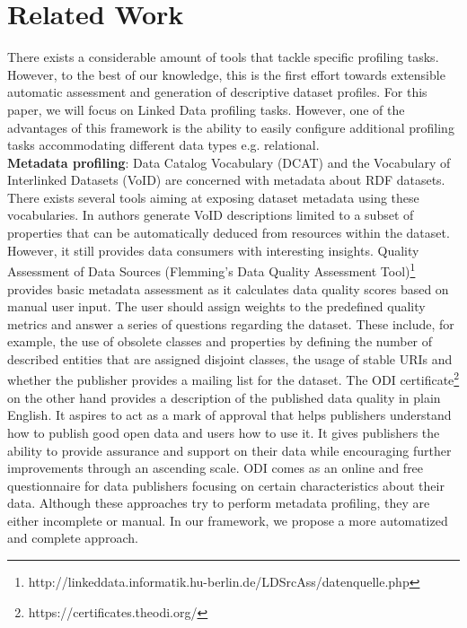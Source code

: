 \documentclass[runningheads,a4paper]{llncs}
\begin{document}

\section{Related Work}
\label{sec:Related Work}

There exists a considerable amount of tools that tackle specific profiling tasks. However, to the best of our knowledge, this is the first effort towards extensible automatic assessment and generation of descriptive dataset profiles. For this paper, we will focus on Linked Data profiling tasks. However, one of the advantages of this framework is the ability to easily configure additional profiling tasks accommodating different data types e.g. relational.\\

\textbf{Metadata profiling}: Data Catalog Vocabulary (DCAT) \cite{Erickson:14:DCV} and the Vocabulary of Interlinked Datasets (VoID) \cite{Cyganiak:11:DLD} are concerned with metadata about RDF datasets. There exists several tools aiming at exposing dataset metadata using these vocabularies. In \cite{BoHm:2011:CVD:2030805.2031001} authors generate VoID descriptions limited to a subset of properties that can be automatically deduced from resources within the dataset. However, it still provides data consumers with interesting insights. Quality Assessment of Data Sources (Flemming's Data Quality Assessment Tool)\footnote{http://linkeddata.informatik.hu-berlin.de/LDSrcAss/datenquelle.php} provides basic metadata assessment as it calculates data quality scores based on manual user input. The user should assign weights to the predefined quality metrics and answer a series of questions regarding the dataset. These include, for example, the use of obsolete classes and properties by defining the number of described entities that are assigned disjoint classes, the usage of stable URIs and whether the publisher provides a mailing list for the dataset. The ODI certificate\footnote {https://certificates.theodi.org/} on the other hand provides a description of the published data quality in plain English. It aspires to act as a mark of approval that helps publishers understand how to publish good open data and users how to use it. It gives publishers the ability to provide assurance and support on their data while encouraging further improvements through an ascending scale. ODI comes as an online and free questionnaire for data publishers focusing on certain characteristics about their data. Although these approaches try to perform metadata profiling, they are either incomplete or manual. In our framework, we propose a more automatized and complete approach.\\
\end{document}
